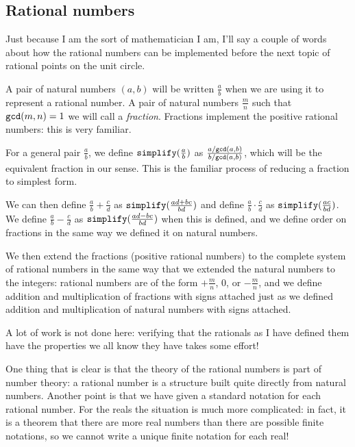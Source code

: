 \documentclass[12pt]{article}
\begin{document}
\subsection{Rational numbers}

Just because I am the sort of mathematician I am, I'll say a couple of words about how the rational numbers can be implemented before the next topic of rational points on the unit circle.

A pair of natural numbers $(a,b)$ will be written $\frac ab$ when we are using it to represent a rational number.
A pair of natural numbers $\frac mn$ such that ${\tt gcd}(m,n)=1$ we will call a {\em fraction}.  Fractions implement the positive rational numbers:  this is very familiar.

For a general pair $\frac ab$, we define ${\tt simplify}(\frac ab)$ as $\frac{a/{\tt gcd}(a,b)}{b/{\tt gcd}(a,b)}$, which will be the equivalent fraction in our sense.   This is the familiar process of reducing a fraction to simplest form.

We can then define $\frac ab + \frac cd$ as ${\tt simplify}(\frac{ad+bc}{bd})$ and define $\frac ab \cdot \frac cd$ as
${\tt simplify}(\frac{ac}{bd})$.  We define $\frac ab - \frac cd$ as ${\tt simplify}(\frac{ad-bc}{bd})$ when this is defined, and we define order on fractions in the same way we defined it on natural numbers.

We then extend the fractions (positive rational numbers) to the complete system of rational numbers in the same way
that we extended the natural numbers to the integers:  rational numbers are of the form $+\frac mn$, 0, or $-\frac mn$, and we define addition and multiplication of fractions with signs attached just as we defined addition and multiplication of natural numbers with signs attached.

A lot of work is not done here:  verifying that the rationals as I have defined them have the properties we all know they have takes some effort!

One thing that is clear is that the theory of the rational numbers is part of number theory:  a rational number is a structure built quite directly from natural numbers.  Another point is that we have given a standard notation for each rational number.   For the reals the situation is much more complicated:  in fact, it is a theorem that there are more real numbers than there are possible finite notations, so we cannot write a unique finite notation for each real!
\end{document}
